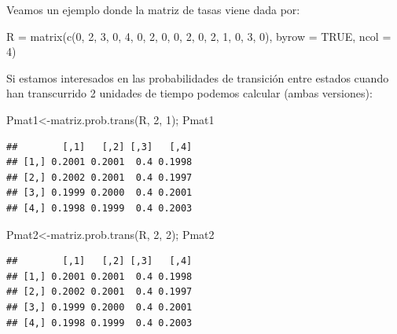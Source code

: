 \documentclass[
]{book}
\newenvironment{Shaded}{\begin{snugshade}}{\end{snugshade}}
\newcommand{\AttributeTok}[1]{\textcolor[rgb]{0.77,0.63,0.00}{#1}}
\newcommand{\ConstantTok}[1]{\textcolor[rgb]{0.00,0.00,0.00}{#1}}
\newcommand{\DecValTok}[1]{\textcolor[rgb]{0.00,0.00,0.81}{#1}}
\newcommand{\FunctionTok}[1]{\textcolor[rgb]{0.00,0.00,0.00}{#1}}
\newcommand{\NormalTok}[1]{#1}
\newcommand{\OtherTok}[1]{\textcolor[rgb]{0.56,0.35,0.01}{#1}}
\theoremstyle{definition}
\theoremstyle{definition}
\theoremstyle{definition}
\theoremstyle{definition}
\theoremstyle{remark}
\begin{document}
Veamos un ejemplo donde la matriz de tasas viene dada por:

\begin{Shaded}
\begin{Highlighting}[]
\NormalTok{R }\OtherTok{=} \FunctionTok{matrix}\NormalTok{(}\FunctionTok{c}\NormalTok{(}\DecValTok{0}\NormalTok{, }\DecValTok{2}\NormalTok{, }\DecValTok{3}\NormalTok{, }\DecValTok{0}\NormalTok{, }\DecValTok{4}\NormalTok{, }\DecValTok{0}\NormalTok{, }\DecValTok{2}\NormalTok{, }\DecValTok{0}\NormalTok{, }\DecValTok{0}\NormalTok{, }\DecValTok{2}\NormalTok{, }\DecValTok{0}\NormalTok{, }\DecValTok{2}\NormalTok{, }\DecValTok{1}\NormalTok{, }\DecValTok{0}\NormalTok{, }\DecValTok{3}\NormalTok{, }\DecValTok{0}\NormalTok{), }\AttributeTok{byrow =} \ConstantTok{TRUE}\NormalTok{, }\AttributeTok{ncol =} \DecValTok{4}\NormalTok{)}
\end{Highlighting}
\end{Shaded}

Si estamos interesados en las probabilidades de transición entre estados cuando han transcurrido 2 unidades de tiempo podemos calcular (ambas versiones):

\begin{Shaded}
\begin{Highlighting}[]
\NormalTok{Pmat1}\OtherTok{\textless{}{-}}\FunctionTok{matriz.prob.trans}\NormalTok{(R, }\DecValTok{2}\NormalTok{, }\DecValTok{1}\NormalTok{); Pmat1}
\end{Highlighting}
\end{Shaded}

\begin{verbatim}
##        [,1]   [,2] [,3]   [,4]
## [1,] 0.2001 0.2001  0.4 0.1998
## [2,] 0.2002 0.2001  0.4 0.1997
## [3,] 0.1999 0.2000  0.4 0.2001
## [4,] 0.1998 0.1999  0.4 0.2003
\end{verbatim}

\begin{Shaded}
\begin{Highlighting}[]
\NormalTok{Pmat2}\OtherTok{\textless{}{-}}\FunctionTok{matriz.prob.trans}\NormalTok{(R, }\DecValTok{2}\NormalTok{, }\DecValTok{2}\NormalTok{); Pmat2}
\end{Highlighting}
\end{Shaded}

\begin{verbatim}
##        [,1]   [,2] [,3]   [,4]
## [1,] 0.2001 0.2001  0.4 0.1998
## [2,] 0.2002 0.2001  0.4 0.1997
## [3,] 0.1999 0.2000  0.4 0.2001
## [4,] 0.1998 0.1999  0.4 0.2003
\end{verbatim}
\end{document}
